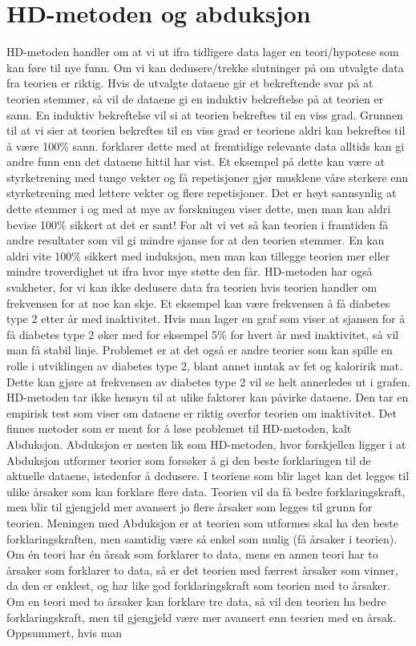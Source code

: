 \documentclass[
]{book}
\begin{document}
\hypertarget{hd-metoden-og-abduksjon}{%
\section{HD-metoden og abduksjon}\label{hd-metoden-og-abduksjon}}

HD-metoden handler om at vi ut ifra tidligere data lager en teori/hypotese som kan føre til nye funn. Om vi kan dedusere/trekke slutninger på om utvalgte data fra teorien er riktig. Hvis de utvalgte dataene gir et bekreftende svar på at teorien stemmer, så vil de dataene gi en induktiv bekreftelse på at teorien er sann. En induktiv bekreftelse vil si at teorien bekreftes til en viss grad. Grunnen til at vi sier at teorien bekreftes til en viss grad er teoriene aldri kan bekreftes til å være 100\% sann. \citet{hempel1966} forklarer dette med at fremtidige relevante data alltids kan gi andre funn enn det dataene hittil har vist. Et eksempel på dette kan være at styrketrening med tunge vekter og få repetisjoner gjør musklene våre sterkere enn styrketrening med lettere vekter og flere repetisjoner. Det er høyt sannsynlig at dette stemmer i og med at mye av forskningen viser dette, men man kan aldri bevise 100\% sikkert at det er sant! For alt vi vet så kan teorien i framtiden få andre resultater som vil gi mindre sjanse for at den teorien stemmer. En kan aldri vite 100\% sikkert med induksjon, men man kan tillegge teorien mer eller mindre troverdighet ut ifra hvor mye støtte den får. HD-metoden har også svakheter, for vi kan ikke dedusere data fra teorien hvis teorien handler om frekvensen for at noe kan skje. Et eksempel kan være frekvensen å få diabetes type 2 etter år med inaktivitet. Hvis man lager en graf som viser at sjansen for å få diabetes type 2 øker med for eksempel 5\% for hvert år med inaktivitet, så vil man få stabil linje. Problemet er at det også er andre teorier som kan spille en rolle i utviklingen av diabetes type 2, blant annet inntak av fet og kaloririk mat. Dette kan gjøre at frekvensen av diabetes type 2 vil se helt annerledes ut i grafen. HD-metoden tar ikke hensyn til at ulike faktorer kan påvirke dataene. Den tar en empirisk test som viser om dataene er riktig overfor teorien om inaktivitet. Det finnes metoder som er ment for å løse problemet til HD-metoden, kalt Abduksjon. Abduksjon er nesten lik som HD-metoden, hvor forskjellen ligger i at Abduksjon utformer teorier som forsøker å gi den beste forklaringen til de aktuelle dataene, istedenfor å dedusere. I teoriene som blir laget kan det legges til ulike årsaker som kan forklare flere data. Teorien vil da få bedre forklaringskraft, men blir til gjengjeld mer avansert jo flere årsaker som legges til grunn for teorien. Meningen med Abduksjon er at teorien som utformes skal ha den beste forklaringskraften, men samtidig være så enkel som mulig (få årsaker i teorien). Om én teori har én årsak som forklarer to data, mens en annen teori har to årsaker som forklarer to data, så er det teorien med færrest årsaker som vinner, da den er enklest, og har like god forklaringskraft som teorien med to årsaker. Om en teori med to årsaker kan forklare tre data, så vil den teorien ha bedre forklaringskraft, men til gjengjeld være mer avansert enn teorien med en årsak. Oppsummert, hvis man 
\end{document}
